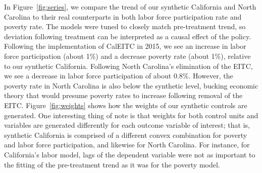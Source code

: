 \documentclass{article}
\begin{document}
In Figure~\ref{fig:series}, we compare the trend of our synthetic California and North Carolina to their real counterparts in both labor force participation rate and poverty rate. The models were tuned to closely match pre-treatment trend, so deviation following treatment can be interpreted as a causal effect of the policy. Following the implementation of CalEITC in 2015, we see an increase in labor force participation (about 1\%) and a decrease poverty rate (about 1\%), relative to our synthetic California. Following North Carolina's elimination of the EITC, we see a decrease in labor force participation of about 0.8\%. However, the poverty rate in North Carolina is also below the synthetic level, bucking economic theory that would presume poverty rates to increase following removal of the EITC. Figure~\ref{fig:weights} shows how the weights of our synthetic controls are generated. One interesting thing of note is that weights for both control units and variables are generated differently for each outcome variable of interest; that is, synthetic California is comprised of a different convex combination for poverty and labor force participation, and likewise for North Carolina. For instance, for California's labor model, lags of the dependent variable were not as important to the fitting of the pre-treatment trend as it was for the poverty model. 

\end{document}
